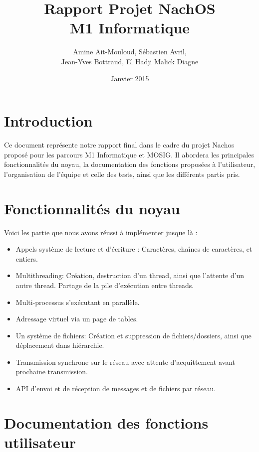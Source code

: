 \documentclass{article}
\begin{document}
\title {Rapport Projet NachOS \\ M1 Informatique}
\author{Amine Ait-Mouloud, Sébastien Avril,\\ Jean-Yves Bottraud, El Hadji Malick Diagne}
\date{Janvier 2015}
\maketitle

\tableofcontents
\newpage
\section{Introduction}
	Ce document représente notre rapport final dans le cadre du projet Nachos proposé pour les parcours M1 Informatique et MOSIG.
	Il abordera les principales fonctionnalités du noyau, la documentation des fonctions proposées à l'utilisateur, l'organisation de l'équipe et celle des tests, ainsi que les différents partis pris.

\section{Fonctionnalités du noyau}
	Voici les partie que nous avons réussi à implémenter jusque là :
	\begin{itemize}
		\item Appels système de lecture et d'écriture : Caractères, chaînes de caractères, et entiers.
		\item Multithreading: Création, destruction d'un thread, ainsi que l'attente d'un autre thread. Partage de la pile d'exécution entre threads.
		\item Multi-processus s'exécutant en parallèle. 
		\item Adressage virtuel via un page de tables.
		\item Un système de fichiers: Création et suppression de fichiers/dossiers, ainsi que déplacement dans hiérarchie.
		\item Transmission synchrone sur le réseau avec attente d'acquittement avant prochaine transmission.
		\item API d'envoi et de réception de messages et de fichiers par réseau. 
	\end{itemize}

\section{Documentation des fonctions utilisateur}
\end{document}
